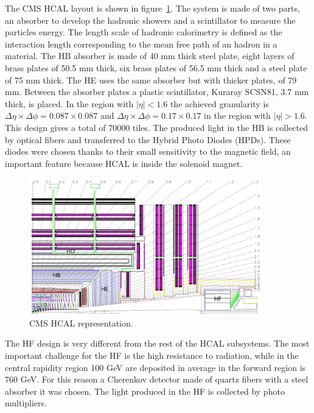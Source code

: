 The CMS HCAL layout is shown in figure~\ref{fig:hcal}. The system is made of two parts, an absorber to develop the hadronic showers and a scintillator to measure the particles energy. The length scale of hadronic calorimetry is defined as the interaction length corresponding to the mean free path of an hadron in a material. The HB absorber is made of 40 mm thick steel plate, eight layers of brass plates of 50.5 mm thick, six brass plates of 56.5 mm thick and a steel plate of 75 mm thick. The HE uses the same absorber but with thicker plates, of 79 mm. Between the absorber plates a plastic scintillator, Kuraray SCSN81, 3.7 mm thick, is placed. In the region with $|\eta|<1.6$ the achieved granularity is $\Delta\eta\times\Delta\phi=0.087\times 0.087$ and $\Delta\eta\times\Delta\phi=0.17\times 0.17$ in the region with $|\eta|>1.6$. This design gives a total of 70000 tiles. The produced light in the HB is collected by optical fibers and transferred to the Hybrid Photo Diodes (HPDs). These diodes were chosen thanks to their small sensitivity to the magnetic field, an important feature because HCAL is inside the solenoid magnet. %

\begin{figure}[!Hhtbp]
  \begin{center}
    \includegraphics[width=0.9\textwidth]{figs/HCAL.png}
    \caption{CMS HCAL representation. }
    \label{fig:hcal}
  \end{center}
\end{figure}

The HF design is very different from the rest of the HCAL subsystems. The most important challenge for the HF is the high resistance to radiation, while in the central rapidity region 100 GeV are deposited in average in the forward region is 760 GeV. For this reason a Cherenkov detector made of quartz fibers with a steel absorber it was chosen. The light produced in the HF is collected by photo multipliers. 

